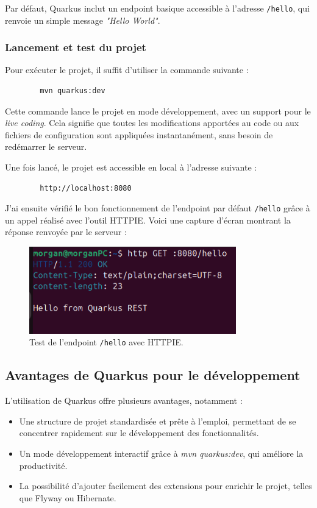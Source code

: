\documentclass{article}
\begin{document}
	Par défaut, Quarkus inclut un endpoint basique accessible à l’adresse \texttt{/hello}, qui renvoie un simple message \textit{"Hello World"}.
	
	\subsubsection{Lancement et test du projet}
	
	Pour exécuter le projet, il suffit d’utiliser la commande suivante :
	\begin{verbatim}
		mvn quarkus:dev
	\end{verbatim}
	
	Cette commande lance le projet en mode développement, avec un support pour le \textit{live coding}. Cela signifie que toutes les modifications apportées au code ou aux fichiers de configuration sont appliquées instantanément, sans besoin de redémarrer le serveur.
	
	Une fois lancé, le projet est accessible en local à l’adresse suivante :
	\begin{verbatim}
		http://localhost:8080
	\end{verbatim}
	
	J’ai ensuite vérifié le bon fonctionnement de l’endpoint par défaut \texttt{/hello} grâce à un appel réalisé avec l’outil HTTPIE. Voici une capture d’écran montrant la réponse renvoyée par le serveur :
	
	\begin{figure}[h!]
		\centering
		\includegraphics[width=0.8\textwidth]{asset/hello.png}
		\caption{Test de l'endpoint \texttt{/hello} avec HTTPIE.}
		\label{fig:hello_endpoint}
	\end{figure}
	
	\subsection{Avantages de Quarkus pour le développement}
	
	L’utilisation de Quarkus offre plusieurs avantages, notamment :
	\begin{itemize}
		\item Une structure de projet standardisée et prête à l’emploi, permettant de se concentrer rapidement sur le développement des fonctionnalités.
		\item Un mode développement interactif grâce à \textit{mvn quarkus:dev}, qui améliore la productivité.
		\item La possibilité d’ajouter facilement des extensions pour enrichir le projet, telles que Flyway ou Hibernate.
	\end{itemize}
	
\end{document}
